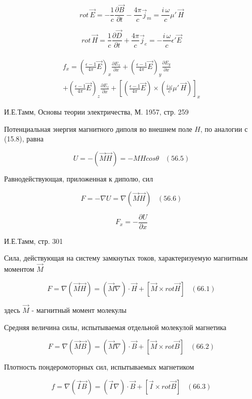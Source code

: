 \documentclass[11pt]{article}
\begin{document}
    \[rot\,\vec{E} = -\frac{1}{c}\frac{\partial \vec B}{\partial t} - \frac{4\pi}{c}\vec j_m = \frac{i\,\omega}{c}\mu'\,\vec{H}\]

\[rot\,\vec{H} = \frac{1}{c}\frac{\partial \vec D}{\partial t} + \frac{4\pi}{c} \vec j_e = - \frac{i\,\omega}{c} \epsilon' \vec{E}\]

    \[\begin{array}{c} \\
f_x
= \left(\frac{\epsilon - 1}{4 \pi}\vec{E}\right)_x \frac{\partial E_x}{\partial x}
+ \left(\frac{\epsilon - 1}{4 \pi}\vec{E}\right)_y \frac{\partial E_y}{\partial x} \\
+ \left(\frac{\epsilon - 1}{4 \pi}\vec{E}\right)_z \frac{\partial E_z}{\partial x}
+ \left[\left(\frac{\epsilon - 1}{4 \pi}\vec{E}\right) \times \left(\frac{i\,\omega}{c}\mu'\,\vec{H}\right)\right]_x
\end{array}\]

    И.Е.Тамм, Основы теории электричества, М. 1957, стр. 259

Потенциальная энергия магнитного диполя во внешнем поле \(H\), по
аналогии с (15.8), равна

\[U = -\left(\vec {M} \vec{H} \right) = -M H cos \theta\,\,\,\,\,(56.5)\]

Равнодействующая, приложенная к диполю, сил

\[F = - \nabla U = \nabla \left(\vec {M} \vec{H} \right)\,\,\,\,\,(56.6)\]

\[F_x = -\frac{\partial U}{\partial x}\]

И.Е.Тамм, стр. 301

Сила, действующая на систему замкнутых токов, характеризуемую магнитным
моментом \(\vec M\)

\[F = \nabla \left(\vec {M} \vec{H} \right) = \left(\vec {M} \nabla \right) \cdot \vec {H} + \left[\vec{M} \times rot \vec{H}\right] \,\,\,\,\,(66.1)\]

здесь \(\vec M\) - магнитный момент молекулы

Средняя величина силы, испытываемая отдельной молекулой магнетика

\[F = \nabla \left(\vec {M} \vec{B} \right) = \left(\vec {M} \nabla \right) \cdot \vec {B} + \left[\vec{M} \times rot \vec{B}\right] \,\,\,\,\,(66.2)\]

Плотность пондеромоторных сил, испытываемых магнетиком

\[f = \nabla \left(\vec {I} \vec{B} \right) = \left(\vec {I} \nabla \right) \cdot \vec {B} + \left[\vec{I} \times rot \vec{B}\right] \,\,\,\,\,(66.3)\]
\end{document}
